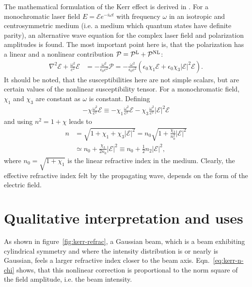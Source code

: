 The mathematical formulation of the Kerr effect is derived in
\textcite[sec.~10.3]{milonni}. For a monochromatic laser field $E =
\mathcal{E} e^{-i \omega t}$ with frequency $\omega$ in an isotropic
and centrosymmetric medium (i.e. a medium which quantum states have
definite parity), an alternative wave equation for the complex laser
field and polarization amplitudes is found. The most important point
here is, that the polarization has a linear and a nonlinear
contribution $\mathcal{P} = \mathcal{P}^{\textup L} +
\mathcal{P}^{\textup{NL}}$:
\begin{align}
  \label{eq:kerr-wave-eqn}
  \nabla^2 \mathcal{E} + \frac{\omega^2}{c^2} \mathcal{E}
  &= - \frac{\omega^2}{\epsilon_0 c^2} \mathcal{P}
  = - \frac{\omega^2}{\epsilon_0 c^2} \left( \epsilon_0 \chi_1
    \mathcal{E} + \epsilon_0 \chi_3 |\mathcal{E}|^2 \mathcal{E}
  \right).
\end{align}
It should be noted, that the susceptibilities here are not simple
scalars, but are certain values of the nonlinear susceptibility
tensor. For a monochromatic field, $\chi_1$ and $\chi_3$ are constant
as $\omega$ is constant. Defining 
\begin{align}
  - \chi \frac{\omega^2}{c^2} \mathcal{E}
  \equiv - \chi_1 \frac{\omega^2}{c^2} \mathcal{E}
  - \chi_3 \frac{\omega^2}{c^2} |\mathcal{E}|^2 \mathcal{E}
\end{align}
and using $n^2 = 1 + \chi$ leads to
\begin{align}
  n &= \sqrt{1 + \chi_1 + \chi_3 |\mathcal{E}|^2}
  = n_0 \sqrt{1 + \frac{\chi_3}{n_0^2} |\mathcal{E}|^2}
  \\
  &\simeq n_0 + \frac{\chi_3}{2n_0} |\mathcal{E}|^2
  \label{eq:kerr-n-chi}
  \equiv n_0 + \tfrac{1}{2} n_2 |\mathcal{E}|^2,
\end{align}
where $n_0 = \sqrt{1 + \chi_1}$ is the linear refractive index in the
medium. Clearly, the effective refractive index felt by the
propagating wave, depends on the form of the electric field.


\section{Qualitative interpretation and uses}
\label{sec:kerr-interpr}

As shown in figure~\ref{fig:kerr-refrac}, a Gaussian beam, which is a
beam exhibiting cylindrical symmetry and where the intensity
distribution is or nearly is Gaussian, feels a larger refractive index
closer to the beam axis. Eqn.~\eqref{eq:kerr-n-chi} shows, that this
nonlinear correction is proportional to the norm square of the field
amplitude, i.e. the beam intensity.

